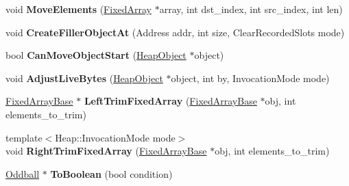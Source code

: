 \begin{DoxyCompactItemize}
\item 
void {\bfseries Move\+Elements} (\hyperlink{classv8_1_1internal_1_1_fixed_array}{Fixed\+Array} $\ast$array, int dst\+\_\+index, int src\+\_\+index, int len)\hypertarget{classv8_1_1internal_1_1_heap_a27fe1afbc9a336387d4595d8de512878}{}\label{classv8_1_1internal_1_1_heap_a27fe1afbc9a336387d4595d8de512878}

\item 
void {\bfseries Create\+Filler\+Object\+At} (Address addr, int size, Clear\+Recorded\+Slots mode)\hypertarget{classv8_1_1internal_1_1_heap_aa6ad7d5e483ec93e53a010d476bdc126}{}\label{classv8_1_1internal_1_1_heap_aa6ad7d5e483ec93e53a010d476bdc126}

\item 
bool {\bfseries Can\+Move\+Object\+Start} (\hyperlink{classv8_1_1internal_1_1_heap_object}{Heap\+Object} $\ast$object)\hypertarget{classv8_1_1internal_1_1_heap_aae28212dc425926486e4efe38fb39fc8}{}\label{classv8_1_1internal_1_1_heap_aae28212dc425926486e4efe38fb39fc8}

\item 
void {\bfseries Adjust\+Live\+Bytes} (\hyperlink{classv8_1_1internal_1_1_heap_object}{Heap\+Object} $\ast$object, int by, Invocation\+Mode mode)\hypertarget{classv8_1_1internal_1_1_heap_abb8ddaa0a4b30e41477def99472085be}{}\label{classv8_1_1internal_1_1_heap_abb8ddaa0a4b30e41477def99472085be}

\item 
\hyperlink{classv8_1_1internal_1_1_fixed_array_base}{Fixed\+Array\+Base} $\ast$ {\bfseries Left\+Trim\+Fixed\+Array} (\hyperlink{classv8_1_1internal_1_1_fixed_array_base}{Fixed\+Array\+Base} $\ast$obj, int elements\+\_\+to\+\_\+trim)\hypertarget{classv8_1_1internal_1_1_heap_ac7870eb612f7cfefde52cdfea3fca05f}{}\label{classv8_1_1internal_1_1_heap_ac7870eb612f7cfefde52cdfea3fca05f}

\item 
{\footnotesize template$<$Heap\+::\+Invocation\+Mode mode$>$ }\\void {\bfseries Right\+Trim\+Fixed\+Array} (\hyperlink{classv8_1_1internal_1_1_fixed_array_base}{Fixed\+Array\+Base} $\ast$obj, int elements\+\_\+to\+\_\+trim)\hypertarget{classv8_1_1internal_1_1_heap_ac51e9abadb9619f7c24330ff9ca403a3}{}\label{classv8_1_1internal_1_1_heap_ac51e9abadb9619f7c24330ff9ca403a3}

\item 
\hyperlink{classv8_1_1internal_1_1_oddball}{Oddball} $\ast$ {\bfseries To\+Boolean} (bool condition)\hypertarget{classv8_1_1internal_1_1_heap_ac17a02cdcde022ae81bed9c6aac5906c}{}\label{classv8_1_1internal_1_1_heap_ac17a02cdcde022ae81bed9c6aac5906c}


\end{DoxyCompactItemize}
